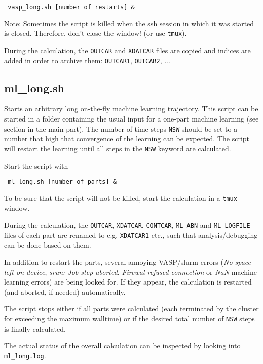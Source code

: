 \documentclass[a4paper,11pt]{article}
\begin{document}
\begin{verbatim}
 vasp_long.sh [number of restarts] &
\end{verbatim}

Note: Sometimes the script is killed when the ssh session in which it was started 
is closed. Therefore, don't close the window! (or use \texttt{tmux}).

During the calculation, the \texttt{OUTCAR} and \texttt{XDATCAR} files 
are copied and indices are added in order to archive them: \texttt{OUTCAR1},
\texttt{OUTCAR2}, ...


\subsection{ml\_long.sh}\label{ml_long}

Starts an arbitrary long on-the-fly machine learning trajectory.
This script can be started in a folder containing the usual input for a 
one-part machine learning (see section in the main part).
The number of time steps \texttt{NSW} should be set to a number that high
that convergence of the learning can be expected. The script will restart the 
learning until all steps in the \texttt{NSW} keyword are calculated.

Start the script with 

\begin{verbatim}
 ml_long.sh [number of parts] &
\end{verbatim}

To be sure that the script will not be killed, start the calculation in a \texttt{tmux} window.

During the calculation, the \texttt{OUTCAR}, \texttt{XDATCAR}. \texttt{CONTCAR}, \texttt{ML\_ABN} 
and \texttt{ML\_LOGFILE} files of each part are renamed to e.g. \texttt{XDATCAR1} etc., such that 
analysis/debugging can be done based on them. 

In addition to restart the parts, several annoying VASP/slurm errors (\textit{No space left on 
device}, \textit{srun: Job step aborted}. \textit{Firewal refused connection} or \textit{NaN} 
machine learning errors) are being looked for. If they appear, the calculation is restarted 
(and aborted, if needed) automatically.

The script stops either if all parts were calculated (each terminated by the cluster 
for exceeding the maximum walltime) or if the desired total number of \texttt{NSW} steps 
is finally calculated.

The actual status of the overall calculation can be inspected by looking into \texttt{ml\_long.log}.
\end{document}
